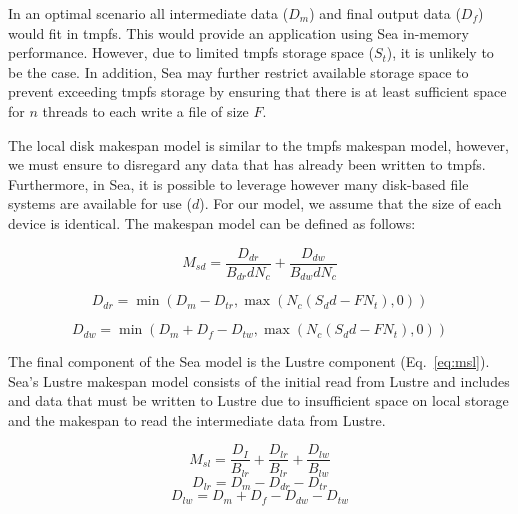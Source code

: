       In an optimal scenario all intermediate data ($D_{m}$) and final output
      data ($D_{f}$) would fit in tmpfs. This would provide an application using
      Sea in-memory performance. However, due to limited tmpfs storage space ($S_{t}$), it is unlikely to be the case. In addition, Sea may further restrict
      available storage space to prevent exceeding tmpfs storage by ensuring that
      there is at least sufficient space for $n$ threads to each write a file of
      size $F$.

      The local disk  makespan model is similar to the tmpfs makespan model, however, we
      must ensure to disregard any data that has already been written to tmpfs.
      Furthermore, in Sea, it is possible to leverage however many disk-based
      file systems are available for use ($d$). For our model, we assume that the
      size of each device is identical.
      The makespan model can be defined as follows:

      \begin{equation}\label{eq:msd}
          M_{sd} =  \frac{D_{dr}}{B_{dr}dN_{c}} + \frac{D_{dw}}{B_{dw}dN_{c}}
      \end{equation}

      \begin{equation*}\label{eq:ddr}
          D_{dr} = \min{(D_{m} - D_{tr}, \max{(N_{c}(S_{d}d - FN_{t}),0)})}
      \end{equation*}

      \begin{equation*}\label{eq:ddw}
          D_{dw} = \min{(D_{m} + D_{f} - D_{tw}, \max{(N_{c}(S_{d}d - FN_{t}),0)})}
      \end{equation*}

            The final component of the Sea model is the Lustre component (Eq.~\ref{eq:msl}). Sea's Lustre
      makespan model consists of the initial read from Lustre and includes and
      data that must be written to Lustre due to insufficient space on local
      storage and the makespan to read the intermediate data from Lustre.

      \begin{equation}\label{eq:msl}
          M_{sl} = \frac{D_{I}}{B_{lr}} + \frac{D_{lr}}{B_{lr}} + \frac{D_{lw}}{B_{lw}}
      \end{equation}
      \begin{equation*}\label{eq:dlr}
          D_{lr} = D_{m} - D_{dr} - D_{tr}
      \end{equation*}
      \begin{equation*}\label{eq:dlw}
          D_{lw} = D_{m} + D_{f} - D_{dw} - D_{tw}
      \end{equation*}

